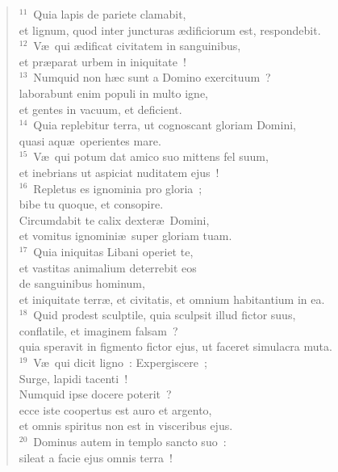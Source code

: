 \begin{verse}
${}^{11}$~Quia lapis de pariete clamabit,\\ et lignum, quod inter juncturas \ae dificiorum est, respondebit.\\
${}^{12}$~V\ae\ qui \ae dificat civitatem in sanguinibus,\\ et pr\ae parat urbem in iniquitate~!\\
${}^{13}$~Numquid non h\ae c sunt a Domino exercituum~?\\ laborabunt enim populi in multo igne,\\ et gentes in vacuum, et deficient.\\
${}^{14}$~Quia replebitur terra, ut cognoscant gloriam Domini,\\ quasi aqu\ae\ operientes mare.\\
${}^{15}$~V\ae\ qui potum dat amico suo mittens fel suum,\\ et inebrians ut aspiciat nuditatem ejus~!\\
${}^{16}$~Repletus es ignominia pro gloria~;\\ bibe tu quoque, et consopire.\\ Circumdabit te calix dexter\ae\ Domini,\\ et vomitus ignomini\ae\ super gloriam tuam.\\
${}^{17}$~Quia iniquitas Libani operiet te,\\ et vastitas animalium deterrebit eos\\ de sanguinibus hominum,\\ et iniquitate terr\ae , et civitatis, et omnium habitantium in ea.\\
${}^{18}$~Quid prodest sculptile, quia sculpsit illud fictor suus,\\ conflatile, et imaginem falsam~?\\ quia speravit in figmento fictor ejus, ut faceret simulacra muta.\\
${}^{19}$~V\ae\ qui dicit ligno~: Expergiscere~;\\ Surge, lapidi tacenti~!\\ Numquid ipse docere poterit~?\\ ecce iste coopertus est auro et argento,\\ et omnis spiritus non est in visceribus ejus.\\
${}^{20}$~Dominus autem in templo sancto suo~:\\ sileat a facie ejus omnis terra~!\end{verse}



